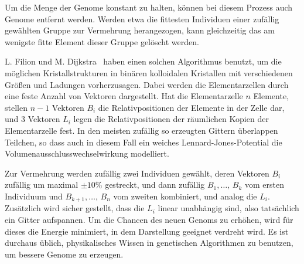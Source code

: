 Um die Menge der Genome konstant zu halten, können bei diesem Prozess
auch Genome entfernt werden. Werden etwa die fittesten Individuen
einer zufällig gewählten Gruppe zur Vermehrung herangezogen, kann
gleichzeitig das am wenigste fitte Element dieser Gruppe gelöscht
werden.

L. Filion und M. Dijkstra~\cite{filion09a} haben einen solchen
Algorithmus benutzt, um die möglichen Kristallstrukturen in binären
kolloidalen Kristallen mit verschiedenen Größen und Ladungen
vorherzusagen. Dabei werden die Elementarzellen durch eine feste
Anzahl von Vektoren dargestellt. Hat die Elementarzelle $n$ Elemente,
stellen $n-1$ Vektoren $B_i$ die Relativpositionen der Elemente in der
Zelle dar, und 3 Vektoren $L_i$ legen die Relativpositionen der
räumlichen Kopien der Elementarzelle fest. In den meisten zufällig so
erzeugten Gittern überlappen Teilchen, so dass auch in diesem Fall ein
weiches Lennard-Jones-Potential die Volumenausschlusswechselwirkung
modelliert.

Zur Vermehrung werden zufällig zwei Individuen gewählt, deren Vektoren
$B_i$ zufällig um maximal $\pm 10\%$ gestreckt, und dann zufällig
$B_1,\ldots,\,B_k$ vom ersten Individuum und $B_{k+1},\ldots,\,B_n$
vom zweiten kombiniert, und analog die $L_i$. Zusätzlich wird sicher
gestellt, dass die $L_i$ linear unabhängig sind, also tatsächlich ein
Gitter aufspannen. Um die Chancen des neuen Genoms zu erhöhen, wird
für dieses die Energie minimiert, in dem Darstellung geeignet verdreht
wird. Es ist durchaus üblich, physikalisches Wissen in genetischen
Algorithmen zu benutzen, um bessere Genome zu erzeugen. 

